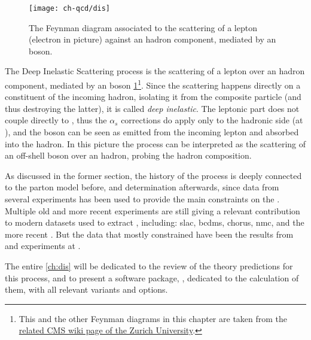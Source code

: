 
\begin{figure}
	\centering
	\texttt{[image: ch-qcd/dis]}
	\caption{
		The \lo Feynman diagram associated to the scattering of a lepton (electron
		in picture) against an hadron component, mediated by an \ew boson.
	}
	\label{fig:qcd/dis}
\end{figure}


The Deep Inelastic Scattering process is the scattering of a lepton over an
hadron component, mediated by an \ew boson \cref{fig:qcd/dis}\footnote{
	This and the other Feynman diagrams in this chapter are taken from the
	\href{https://wiki.physik.uzh.ch/cms/latex:feynman}{related CMS wiki page
		of the Zurich University}.
}.
%
Since the scattering happens directly on a constituent of the incoming hadron,
isolating it from the composite particle (and thus destroying the latter), it
is called \textit{deep inelastic}.
%
The leptonic part does not couple directly to \qcd , thus the $\alpha_s$
corrections do apply only to the hadronic side (at \lo \ew), and the \ew boson
can be seen as emitted from the incoming lepton and absorbed into the hadron.
%
In this picture the process can be interpreted as the scattering of an
off-shell \ew boson over an hadron, probing the hadron composition.

As discussed in the former section, the history of the \dis process is deeply
connected to the parton model before, and \pdfs determination afterwards,
since data from several \dis experiments has been used to provide the main
constraints on the \pdfs.
%
Multiple old and more recent \dis experiments are still giving a relevant
contribution to modern datasets used to extract \pdfs, including:
\acrfull{slac}, \acrfull{bcdms}, \acrfull{chorus}, \acrfull{nmc}, and the more
recent \nutev.
%
But the \dis data that mostly constrained \pdfs have been the results from
\hone and \zeus experiments at \hera.

The entire \cref{ch:dis} will be dedicated to the review of the theory
predictions for this process, and to present a software package, \yadism,
dedicated to the calculation of them, with all relevant variants and options.
